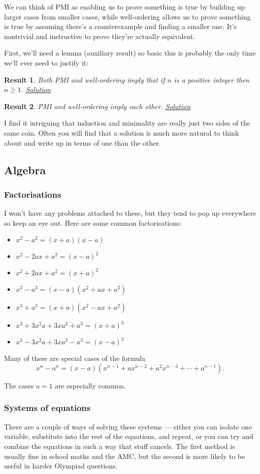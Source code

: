 \documentclass{amsart}
\newtheorem{result}{Result}[subsubsection]
\begin{document}
We can think of PMI as enabling us to prove something is true by building up
larger cases from smaller cases, while well-ordering allows us to prove
something is true by assuming there's a counterexample and finding a smaller
one. It's nontrivial and instructive to prove they're actually
equivalent.

First, we'll need a lemma (auxiliary result) so basic this is probably the only
time we'll ever need to justify it:
\begin{result}\label{r:b:m:4:2}
  Both PMI and well-ordering imply that if $n$ is a positive integer then $n\ge
  1$.
  \hyperlink{s:m:4:2}{Solution}
\end{result}
\begin{result}\label{r:b:m:4:3}
  PMI and well-ordering imply each other.
  \hyperlink{s:m:4:3}{Solution}
\end{result}
I find it intriguing that induction and minimality are really just two sides of
the same coin. Often you will find that a solution is much more natural to think
about and write up in terms of one than the other.
\subsection{Algebra}
\subsubsection{Factorisations}\label{b:a:factor}
I won't have any problems attached to these, but they tend to pop up everywhere
so keep an eye out. Here are some common factorisations:
\begin{itemize}
  \item $x^2-a^2=(x+a)(x-a)$
  \item $x^2-2ax+a^2=(x-a)^2$
  \item $x^2+2ax+a^2=(x+a)^2$
  \item $x^3-a^3=(x-a)(x^2+ax+a^2)$
  \item $x^3+a^3=(x+a)(x^2-ax+a^2)$
  \item $x^3+3x^2a+3xa^2+a^3=(x+a)^3$
  \item $x^3-3x^2a+3xa^2-a^3=(x-a)^3$
\end{itemize}
Many of these are special cases of the formula
\[x^n-a^n=(x-a)(x^{n-1}+ax^{n-2}+a^2x^{n-3}+\cdots+a^{n-1}).\]

The cases $a=1$ are especially common.
\subsubsection{Systems of equations}
There are a couple of ways of solving these systems --- either you can
isolate one variable, substitute into the rest of the equations, and repeat, or
you can try and combine the equations in such a way that stuff cancels. The
first method is usually fine in school maths and the AMC, but the second is more
likely to be useful in harder Olympiad questions.
\end{document}
